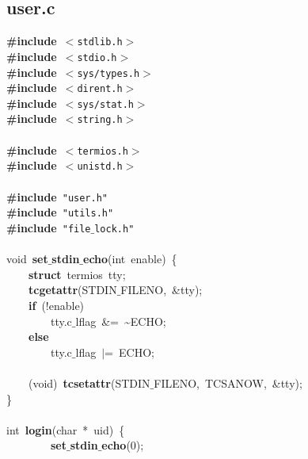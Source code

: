 \clearpage
\normalsize
\rmfamily
\subsection{user.c}
\scriptsize
\sffamily
\noindent
\mbox{}\textbf{\#include}\ \texttt{$<$stdlib.h$>$} \\
\mbox{}\textbf{\#include}\ \texttt{$<$stdio.h$>$} \\
\mbox{}\textbf{\#include}\ \texttt{$<$sys/types.h$>$} \\
\mbox{}\textbf{\#include}\ \texttt{$<$dirent.h$>$} \\
\mbox{}\textbf{\#include}\ \texttt{$<$sys/stat.h$>$} \\
\mbox{}\textbf{\#include}\ \texttt{$<$string.h$>$} \\
\mbox{} \\
\mbox{}\textbf{\#include}\ \texttt{$<$termios.h$>$} \\
\mbox{}\textbf{\#include}\ \texttt{$<$unistd.h$>$} \\
\mbox{} \\
\mbox{}\textbf{\#include}\ \texttt{"{}user.h"{}} \\
\mbox{}\textbf{\#include}\ \texttt{"{}utils.h"{}} \\
\mbox{}\textbf{\#include}\ \texttt{"{}file$\_$lock.h"{}} \\
\mbox{} \\
\mbox{}void\ \textbf{set$\_$stdin$\_$echo}(int\ enable)\ \{ \\
\mbox{}\ \ \ \ \textbf{struct}\ termios\ tty; \\
\mbox{}\ \ \ \ \textbf{tcgetattr}(STDIN$\_$FILENO,\ \&tty); \\
\mbox{}\ \ \ \ \textbf{if}\ (!enable) \\
\mbox{}\ \ \ \ \ \ \ \ tty.c$\_$lflag\ \&=\ \textasciitilde{}ECHO; \\
\mbox{}\ \ \ \ \textbf{else} \\
\mbox{}\ \ \ \ \ \ \ \ tty.c$\_$lflag\ $|$=\ ECHO; \\
\mbox{} \\
\mbox{}\ \ \ \ (void)\ \textbf{tcsetattr}(STDIN$\_$FILENO,\ TCSANOW,\ \&tty); \\
\mbox{}\} \\
\mbox{} \\
\mbox{}int\ \textbf{login}(char\ *\ uid)\ \{ \\
\mbox{}\ \ \ \ \ \ \ \ \textbf{set$\_$stdin$\_$echo}(0); \\
